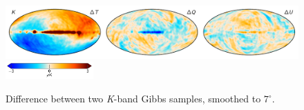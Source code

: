\documentclass[twocolumn]{../../common/aa}
\newcommand{\K}[0]{\textit K}
\begin{document}
\begin{figure}[t]
	\centering
	\includegraphics[width=\textwidth]{figures/023-WMAP_K_sampdiff.pdf}\\
	\includegraphics[width=0.30\textwidth]{figures/cbar_3uK.pdf}        
	\caption{Difference between two \K-band Gibbs samples, smoothed to $7^\circ$.}
        \label{fig:Ksampdiff}
\end{figure}
\end{document}
